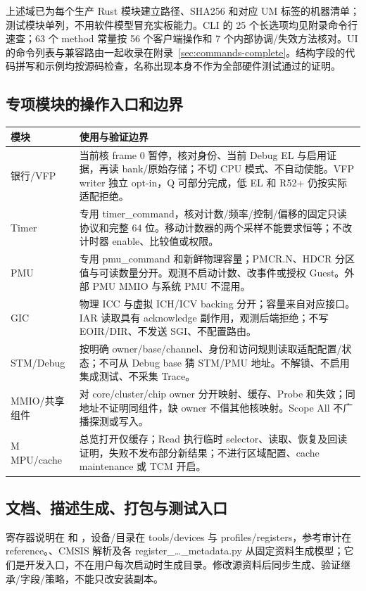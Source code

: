 \documentclass[UTF8,a4paper,11pt,oneside,fontset=none]{ctexart}
\begin{document}
上述域已为每个生产 Rust 模块建立路径、SHA256 和对应 UM 标签的机器清单；测试模块单列，不用软件模型冒充实板能力。CLI 的 25 个长选项均见附录命令行速查；63 个 method 常量按 56 个客户端操作和 7 个内部协调/失效方法核对。UI 的命令列表与兼容路由一起收录在附录~\ref{sec:commands-complete}。结构字段的代码拼写和示例均按源码检查，名称出现本身不作为全部硬件测试通过的证明。

\subsection{专项模块的操作入口和边界}
\begin{longtable}{@{}P{31mm}P{130mm}@{}}\toprule
模块 & 使用与验证边界\\\midrule\endhead
银行/VFP & 当前核 frame 0 暂停，核对身份、当前 Debug EL 与启用证据，再读 bank/原始存储；不切 CPU 模式、不自动使能。VFP writer 独立 opt-in，Q 可部分完成，低 EL 和 R52+ 仍按实际适配拒绝。\\
Timer & 专用 timer\_command，核对计数/频率/控制/偏移的固定只读协议和完整 64 位。移动计数器的两个采样不能要求恒等；不改计时器 enable、比较值或权限。\\
PMU & 专用 pmu\_command 和新鲜物理容量；PMCR.N、HDCR 分区值与可读数量分开。观测不启动计数、改事件或授权 Guest。外部 PMU MMIO 与系统 PMU 不混用。\\
GIC & 物理 ICC 与虚拟 ICH/ICV backing 分开；容量来自对应接口。IAR 读取具有 acknowledge 副作用，观测后端拒绝；不写 EOIR/DIR、不发送 SGI、不配置路由。\\
STM/Debug & 按明确 owner/base/channel、身份和访问规则读取适配配置/状态；不可从 Debug base 猜 STM/PMU 地址。不解锁、不启用集成测试、不采集 Trace。\\
MMIO/共享组件 & 对 core/cluster/chip owner 分开映射、缓存、Probe 和失效；同地址不证明同组件，缺 owner 不借其他核映射。Scope All 不广播探测或写入。\\
M MPU/cache & 总览打开仅缓存；Read 执行临时 selector、读取、恢复及回读证明，失败不发布部分新结果；不进行区域配置、cache maintenance 或 TCM 开启。\\\bottomrule
\end{longtable}

\subsection{文档、描述生成、打包与测试入口}
寄存器说明在  和 ，设备/目录在 tools/devices 与 profiles/registers，参考审计在 reference。、CMSIS 解析及各 register\_\ldots\_metadata.py 从固定资料生成模型；它们是开发入口，不在用户每次启动时生成目录。修改源资料后同步生成、验证继承/字段/策略，不能只改安装副本。
\end{document}
